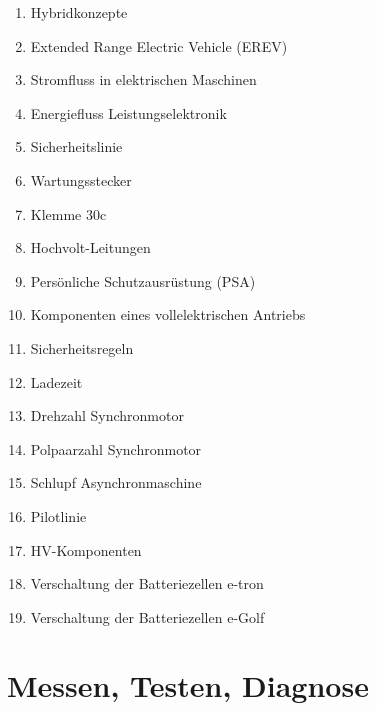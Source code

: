 \begin{enumerate}
\item
  Hybridkonzepte\\
\item
  Extended Range Electric Vehicle (EREV)\\
\item
  Stromfluss in elektrischen Maschinen\\
\item
  Energiefluss Leistungselektronik\\
\item
  Sicherheitslinie\\
\item
  Wartungsstecker\\
\item
  Klemme 30c\\
\item
  Hochvolt-Leitungen\\
\item
  Persönliche Schutzausrüstung (PSA)\\
\item
  Komponenten eines vollelektrischen Antriebs\\
\item
  Sicherheitsregeln\\
\item
  Ladezeit\\
\item
  Drehzahl Synchronmotor\\
\item
  Polpaarzahl Synchronmotor\\
\item
  Schlupf Asynchronmaschine\\
\item
  Pilotlinie\\
\item
  HV-Komponenten\\
\item
  Verschaltung der Batteriezellen e-tron\\
\item
  Verschaltung der Batteriezellen e-Golf
\end{enumerate}

\section{Messen, Testen, Diagnose}\label{messen-testen-diagnose}

